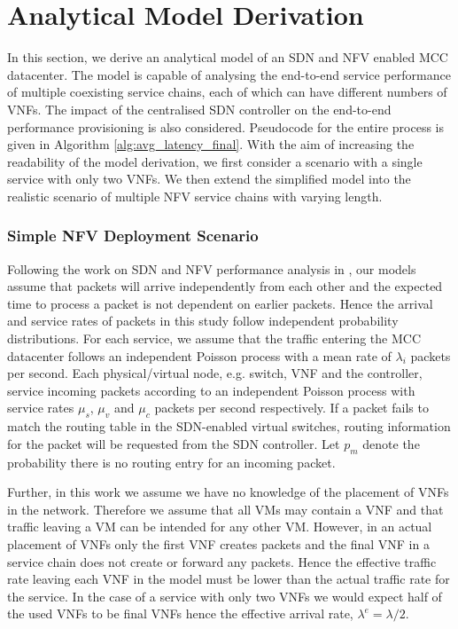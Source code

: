 
\section{Analytical Model Derivation}
\label{sec:analytical_model}

In this section, we derive an analytical model of an SDN and NFV enabled MCC datacenter. The model is capable of analysing the end-to-end service performance of multiple coexisting service chains, each of which can have different numbers of VNFs. The impact of the centralised SDN controller on the end-to-end performance provisioning is also considered. Pseudocode for the entire process is given in Algorithm \ref{alg:avg_latency_final}. With the aim of increasing the readability of the model derivation, we first consider a scenario with a single service with only two VNFs. We then extend the simplified model into the realistic scenario of multiple NFV service chains with varying length.

\subsubsection{Simple NFV Deployment Scenario}
Following the work on SDN and NFV performance analysis in \cite{LongoDBS15, GebertZLST16, MiaoMWHZWL19}, our models assume that packets will arrive independently from each other and the expected time to process a packet is not dependent on earlier packets. Hence the arrival and service rates of packets in this study follow independent probability distributions. For each service, we assume that the traffic entering the MCC datacenter follows an independent Poisson process with a mean rate of $\lambda_i$ packets per second. Each physical/virtual node, e.g. switch, VNF and the controller, service incoming packets according to an independent Poisson process with service rates $\mu_{s}$, $\mu_{v}$ and $\mu_{c}$ packets per second respectively. If a packet fails to match the routing table in the SDN-enabled virtual switches, routing information for the packet will be requested from the SDN controller. Let $p_m$ denote the probability there is no routing entry for an incoming packet.

Further, in this work we assume we have no knowledge of the placement of VNFs in the network. Therefore we assume that all VMs may contain a VNF and that traffic leaving a VM can be intended for any other VM. However, in an actual placement of VNFs only the first VNF creates packets and the final VNF in a service chain does not create or forward any packets. Hence the effective traffic rate leaving each VNF in the model must be lower than the actual traffic rate for the service. In the case of a service with only two VNFs we would expect half of the used VNFs to be final VNFs hence the effective arrival rate, $\lambda^e = \lambda / 2$.

